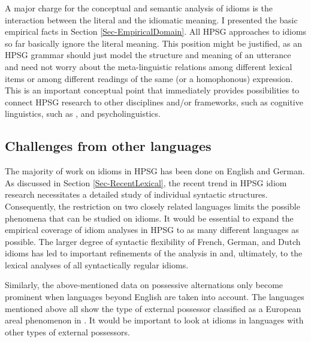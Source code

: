 \documentclass[output=paper]{langsci/langscibook}
\begin{document}
A major charge for the conceptual and semantic analysis of idioms is the interaction between the literal and the idiomatic meaning. 
I presented the basic empirical facts in Section \ref{Sec-EmpiricalDomain}. 
All HPSG approaches to idioms so far basically ignore the literal meaning.
This position might be justified, as  an HPSG grammar should just model the structure and meaning of an utterance and need not worry about the meta-linguistic relations among different lexical items or among different readings of the same (or a homophonous) expression.
This is an important conceptual point that immediately provides possibilities to connect HPSG research to other disciplines and/or frameworks, such as cognitive linguistics, such as \cite{Dobrovolskij:Piirainen:05}, and psycholinguistics.




\subsection{Challenges from other languages}
\label{Sec-OtherLanguages}

The majority of work on idioms in HPSG has been done on English and German. 
As discussed in Section \ref{Sec-RecentLexical}, the recent trend in HPSG idiom research necessitates a detailed study of individual syntactic structures. 
Consequently, the restriction on two closely related languages limits the possible phenomena that can be studied on idioms. 
It would be essential to expand the empirical coverage of idiom analyses in HPSG to as many different languages as possible. 
The larger degree of syntactic flexibility of French, German, and Dutch idioms \citep{Ruwet:91,NSW94a,Schenk:95} has led to important refinements of the analysis in \cite{NSW94a} and, ultimately, to the lexical analyses of all syntactically regular idioms. 

Similarly, the above-mentioned data on possessive alternations only become prominent when languages beyond English are taken into account. The languages mentioned above  all show the type of external possessor classified as a European areal phenomenon in \cite{Haspelmath:99}. 
It would be important to look at idioms in languages with other types of external possessors.
\end{document}
